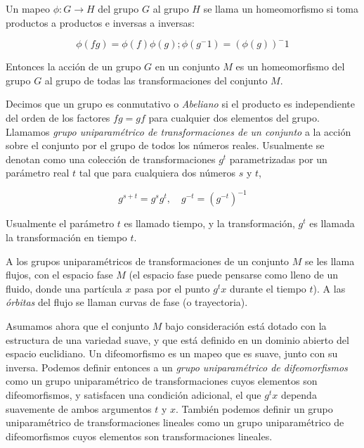 \documentclass[a4paper,10pt]{article}
\numberwithin{equation}{section}
\begin{document}
\vspace{.3cm}

Un mapeo $\phi: G \rightarrow H$ del grupo $G$ al grupo $H$ se llama un
homeomorfismo si toma productos a productos e inversas a inversas:

\begin{equation}
 \phi(fg) = \phi(f)\phi(g); \phi(g^-1) = (\phi(g))^-1
\end{equation}

Entonces la acción de un grupo $G$ en un conjunto $M$ es un homeomorfismo
del grupo $G$ al grupo de todas las transformaciones del conjunto $M$. 

\vspace{.3cm}

Decimos que un grupo es conmutativo o \emph{Abeliano} si el producto es 
independiente del orden de los factores $fg = gf$ para cualquier dos elementos
del grupo. Llamamos \emph{grupo uniparamétrico de transformaciones de un 
conjunto} a la acción sobre el conjunto por el grupo de todos los números reales.
Usualmente se denotan como una colección de transformaciones $g^t$ parametrizadas
por un parámetro real $t$ tal que para cualquiera dos números $s$ y $t$,

\begin{equation}
 g^{s+t} = g^s g^t, \quad g^{-t} = (g^{-t})^{-1}
\end{equation}

Usualmente el parámetro $t$ es llamado tiempo, y la transformación, 
$g^t$ es llamada la transformación en tiempo $t$. 

\vspace{.3cm}

A los grupos uniparamétricos de transformaciones de un conjunto $M$ se 
les llama flujos, con el espacio fase $M$ (el espacio fase puede pensarse
como lleno de un fluido, donde una partícula $x$ pasa por el punto $g^t x$
durante el tiempo $t$). A las \emph{órbitas} del flujo se llaman curvas
de fase (o trayectoria).

\vspace{.3cm}

Asumamos ahora que el conjunto $M$ bajo consideración está dotado con la estructura
de una variedad suave, y que está definido en un dominio abierto del 
espacio euclidiano. Un difeomorfismo es un mapeo que es suave, junto
con su inversa. Podemos definir entonces a un \emph{grupo uniparamétrico de 
difeomorfismos} como un grupo uniparamétrico de transformaciones cuyos elementos
son difeomorfismos, y satisfacen una condición adicional, el que $g^t x$ 
dependa suavemente de ambos argumentos $t$ y $x$. También podemos 
definir un grupo uniparamétrico de transformaciones lineales como un 
grupo uniparamétrico de difeomorfismos cuyos elementos son transformaciones
lineales.
\end{document}
